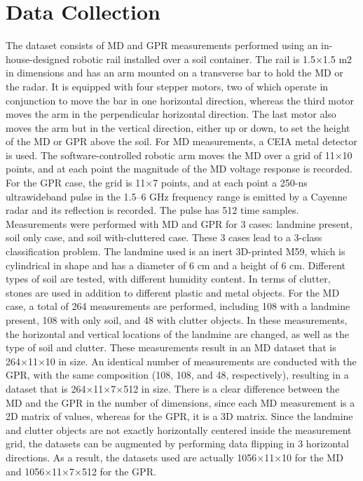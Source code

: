 \documentclass{ieeeaccess}
\begin{document}
\section{Data Collection}
The dataset consists of MD and GPR measurements performed using an in-house-designed robotic rail installed over a soil container. The rail is 1.5×1.5 m2 in dimensions and has an arm mounted on a transverse bar to hold the MD or the radar. It is equipped with four stepper motors, two of which operate in conjunction to move the bar in one horizontal direction, whereas the third motor moves the arm in the perpendicular horizontal direction. The last motor also moves the arm but in the vertical direction, either up or down, to set the height of the MD or GPR above the soil.
For MD measurements, a CEIA metal detector is used. The software-controlled robotic arm moves the MD over a grid of 11×10 points, and at each point the magnitude of the MD voltage response is recorded. For the GPR case, the grid is 11×7 points, and at each point a 250-ns ultrawideband pulse in the 1.5–6 GHz frequency range is emitted by a Cayenne radar and its reflection is recorded. The pulse has 512 time samples.
Measurements were performed with MD and GPR for 3 cases: landmine present, soil only case, and soil with-cluttered case. These 3 cases lead to a 3-class classification problem. The landmine used is an inert 3D-printed M59, which is cylindrical in shape and has a diameter of 6 cm and a height of 6 cm. Different types of soil are tested, with different humidity content. In terms of clutter, stones are used in addition to different plastic and metal objects.
For the MD case, a total of 264 measurements are performed, including 108 with a landmine present, 108 with only soil, and 48 with clutter objects. In these measurements, the horizontal and vertical locations of the landmine are changed, as well as the type of soil and clutter. These measurements result in an MD dataset that is 264×11×10 in size. An identical number of measurements are conducted with the GPR, with the same composition (108, 108, and 48, respectively), resulting in a dataset that is 264×11×7×512 in size. There is a clear difference between the MD and the GPR in the number of dimensions, since each MD measurement is a 2D matrix of values, whereas for the GPR, it is a 3D matrix.
Since the landmine and clutter objects are not exactly horizontally centered inside the measurement grid, the datasets can be augmented by performing data flipping in 3 horizontal directions. As a result, the datasets used are actually 1056×11×10 for the MD and 1056×11×7×512 for the GPR.
\end{document}
